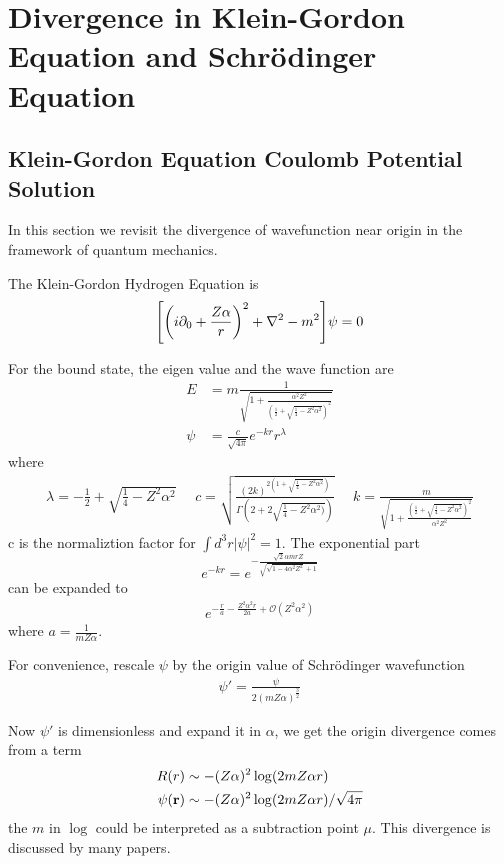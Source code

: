\documentclass[aps,prd,preprint,showkeys,10pt]{revtex4-1}
\renewcommand{\a}{\alpha}
\begin{document}
\section{Divergence in Klein-Gordon Equation and Schr\"odinger Equation\label{sec:qm}}
\subsection{Klein-Gordon Equation Coulomb Potential Solution}
In this section we revisit the divergence of wavefunction near origin in the framework of quantum mechanics.

The Klein-Gordon Hydrogen Equation is
\begin{align}
	\bqty{\pqty{i\partial_0+\frac{Z\alpha}{r}}^2+\nabla^2-m^2}\psi=0
\end{align}

For the bound state, the eigen value and the wave function are\cite{Greiner2000}
\begin{align}
	E    & =m\frac{1}{\sqrt{1+\frac{\alpha^2 Z^2}{(\frac{1}{2}+\sqrt{\frac{1}{4}-Z^2\alpha^2})^2}}} \\
	\psi & =\frac{c}{\sqrt{4\pi}}e^{-kr}r^\lambda
\end{align}
where
\begin{align}
	\lambda=-\frac{1}{2}+\sqrt{\frac{1}{4}-Z^2\alpha^2}\ \ \ \ \ \
	c=\sqrt{\frac{(2k)^{2(1+\sqrt{\frac{1}{4}-Z^2\alpha^2})}}{\Gamma(2+2\sqrt{\frac{1}{4}-Z^2\alpha^2)})}}\ \ \ \ \ \
	k=\frac{m}{\sqrt{1+\frac{(\frac{1}{2}+\sqrt{\frac{1}{4}-Z^2\alpha^2})^2}{\alpha^2Z^2}}}
\end{align}
c is the normaliztion factor for $\int d^3r|\psi|^2=1$. The exponential part 
$$e^{-kr}=e^{-\frac{\sqrt{2} \alpha  m r Z}{\sqrt{\sqrt{1-4 \alpha ^2 Z^2}+1}}}$$
can be expanded to 
\begin{align*}
	e^{-\frac{r}{a}-\frac{Z^2\alpha ^2 r }{2 a}+\mathcal{O}(Z^2\a^2)}
\end{align*}
where $a=\frac{1}{mZ\a}$. 

For convenience, rescale $\psi$ by the origin value of Schr\"odinger wavefunction
\begin{align}
	\psi '=\frac{\psi}{2(mZ\alpha)^\frac{3}{2}}
\end{align}

Now $\psi '$ is dimensionless and expand it in $\alpha$, we get the origin divergence comes from a term
\begin{align}
	R(r)         & \sim-(Z\alpha)^2\log(2m Z \a r)             \\
	\psi(\vb{r}) & \sim-(Z\alpha)^2\log(2m Z \a r)/\sqrt{4\pi}
\end{align}
the $m$ in $\log$ could be interpreted as a subtraction point $\mu$. This divergence is discussed by many papers\cite{Chen2007,Chen2009}.
\end{document}
